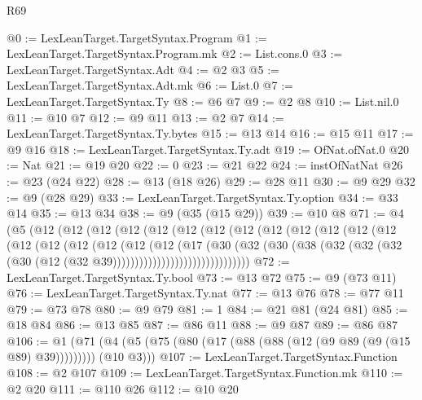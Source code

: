 \begin{lexlean}{R69}
\begin{coremodule}
@0 := LexLeanTarget.TargetSyntax.Program
@1 := LexLeanTarget.TargetSyntax.Program.mk
@2 := List.cons.{0}
@3 := LexLeanTarget.TargetSyntax.Adt
@4 := @2 @3
@5 := LexLeanTarget.TargetSyntax.Adt.mk
@6 := List.{0}
@7 := LexLeanTarget.TargetSyntax.Ty
@8 := @6 @7
@9 := @2 @8
@10 := List.nil.{0}
@11 := @10 @7
@12 := @9 @11
@13 := @2 @7
@14 := LexLeanTarget.TargetSyntax.Ty.bytes
@15 := @13 @14
@16 := @15 @11
@17 := @9 @16
@18 := LexLeanTarget.TargetSyntax.Ty.adt
@19 := OfNat.ofNat.{0}
@20 := Nat
@21 := @19 @20
@22 := 0
@23 := @21 @22
@24 := instOfNatNat
@26 := @23 (@24 @22)
@28 := @13 (@18 @26)
@29 := @28 @11
@30 := @9 @29
@32 := @9 (@28 @29)
@33 := LexLeanTarget.TargetSyntax.Ty.option
@34 := @33 @14
@35 := @13 @34
@38 := @9 (@35 (@15 @29))
@39 := @10 @8
@71 := @4
    (@5
      (@12
        (@12
          (@12
            (@12
              (@12
                (@12
                  (@12
                    (@12
                      (@12
                        (@12
                          (@12
                            (@12
                              (@12
                                (@12
                                  (@12
                                    (@12
                                      (@12
                                        (@12
                                          (@12
                                            (@17
                                              (@30
                                                (@32
                                                  (@30
                                                    (@38
                                                      (@32
                                                        (@32
                                                          (@32
                                                            (@30
                                                              (@12
                                                                (@32
                                                                  @39)))))))))))))))))))))))))))))))
@72 := LexLeanTarget.TargetSyntax.Ty.bool
@73 := @13 @72
@75 := @9 (@73 @11)
@76 := LexLeanTarget.TargetSyntax.Ty.nat
@77 := @13 @76
@78 := @77 @11
@79 := @73 @78
@80 := @9 @79
@81 := 1
@84 := @21 @81 (@24 @81)
@85 := @18 @84
@86 := @13 @85
@87 := @86 @11
@88 := @9 @87
@89 := @86 @87
@106 := @1 (@71 (@4 (@5 (@75 (@80 (@17 (@88 (@88 (@12 (@9 @89 (@9 (@15 @89) @39))))))))) (@10 @3)))
@107 := LexLeanTarget.TargetSyntax.Function
@108 := @2 @107
@109 := LexLeanTarget.TargetSyntax.Function.mk
@110 := @2 @20
@111 := @110 @26
@112 := @10 @20

\end{coremodule}
\end{lexlean}
